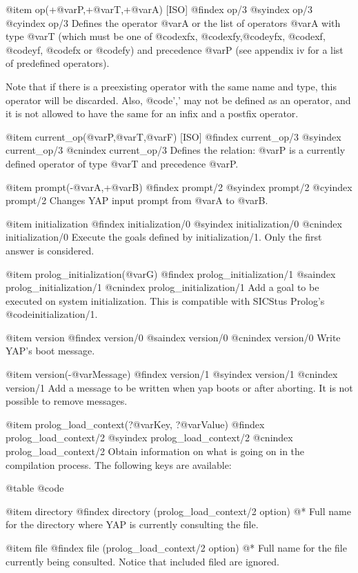 {{{{{{{{{@item op(+@var{P},+@var{T},+@var{A}) [ISO]
@findex op/3
@syindex op/3
@cyindex op/3
Defines the operator @var{A} or the list of operators @var{A} with type
@var{T} (which must be one of @code{xfx}, @code{xfy},@code{yfx},
@code{xf}, @code{yf}, @code{fx} or @code{fy}) and precedence @var{P}
(see appendix iv for a list of predefined operators).

Note that if there is a preexisting operator with the same name and
type, this operator will be discarded. Also, @code{','} may not be defined
as an operator, and it is not allowed to have the same for an infix and
a postfix operator.

@item current_op(@var{P},@var{T},@var{F}) [ISO]
@findex current_op/3
@syindex current_op/3
@cnindex current_op/3
Defines the relation: @var{P} is a currently defined  operator of type
@var{T} and precedence @var{P}.

@item prompt(-@var{A},+@var{B})
@findex prompt/2
@syindex prompt/2
@cyindex prompt/2
Changes YAP input prompt from @var{A} to @var{B}.

@item initialization
@findex initialization/0
@syindex initialization/0
@cnindex initialization/0
Execute the goals defined by initialization/1. Only the first answer is
considered.

@item prolog_initialization(@var{G})
@findex prolog_initialization/1
@saindex prolog_initialization/1
@cnindex prolog_initialization/1
Add a goal to be executed on system initialization. This is compatible
with SICStus Prolog's @code{initialization/1}.

@item version
@findex version/0
@saindex version/0
@cnindex version/0
Write YAP's boot message. 

@item version(-@var{Message})
@findex version/1
@syindex version/1
@cnindex version/1
Add a message to be written when yap boots or after aborting. It is not
possible to remove messages.

@item prolog_load_context(?@var{Key}, ?@var{Value})
@findex prolog_load_context/2
@syindex prolog_load_context/2
@cnindex prolog_load_context/2
Obtain information on what is going on in the compilation process. The
following keys are available:

@table @code

@item directory
@findex directory (prolog_load_context/2 option)
@* 
Full name for the directory where YAP is currently consulting the
file.

@item file
@findex file (prolog_load_context/2 option)
@*
Full name for the file currently being consulted. Notice that included
filed are ignored.

}}}}}}}}}
